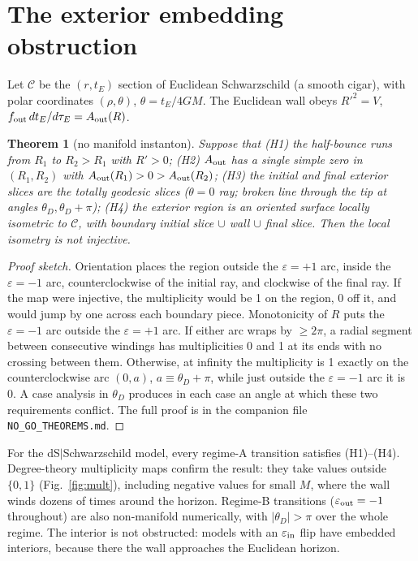\documentclass[11pt,a4paper]{article}
\newtheorem{theorem}{Theorem}
\theoremstyle{remark}\newtheorem{remark}[theorem]{Remark}
\newcommand{\ein}{\varepsilon_{\rm in}}
\newcommand{\eout}{\varepsilon_{\rm out}}
\newcommand{\fout}{f_{\rm out}}
\begin{document}
\section{The exterior embedding obstruction}\label{sec:obstruction}
Let $\mathcal C$ be the $(r,t_E)$ section of Euclidean Schwarzschild (a smooth cigar), with polar coordinates
$(\rho,\theta)$, $\theta=t_E/4GM$. The Euclidean wall obeys $R'^2=V$, $\fout\,dt_E/d\tau_E=A_{\rm out}(R)$.
\begin{theorem}[no manifold instanton]\label{thm:NG3}
Suppose that (H1) the half-bounce runs from $R_1$ to $R_2>R_1$ with $R'>0$; (H2) $A_{\rm out}$ has a single simple zero in
$(R_1,R_2)$ with $A_{\rm out}(R_1)>0>A_{\rm out}(R_2)$; (H3) the initial and final exterior slices are the totally geodesic slices
($\theta=0$ ray; broken line through the tip at angles $\theta_D,\theta_D+\pi$); (H4) the exterior region is an oriented surface
locally isometric to $\mathcal C$, with boundary initial slice $\cup$ wall $\cup$ final slice. Then the local isometry is not
injective.
\end{theorem}
\begin{proof}[Proof sketch]
Orientation places the region outside the $\varepsilon=+1$ arc, inside the $\varepsilon=-1$ arc, counterclockwise of the initial
ray, and clockwise of the final ray. If the map were injective, the multiplicity would be 1 on the region, 0 off it,
and would jump by one across each boundary piece. Monotonicity of $R$ puts the $\varepsilon=-1$ arc outside the $\varepsilon=+1$
arc. If either arc wraps by $\ge2\pi$, a radial segment between consecutive windings has multiplicities 0 and 1 at its
ends with no crossing between them. Otherwise, at infinity the multiplicity is 1 exactly on the counterclockwise arc
$(0,a)$, $a\equiv\theta_D+\pi$, while just outside the $\varepsilon=-1$ arc it is 0. A case analysis in $\theta_D$ produces in each case
an angle at which these two requirements conflict. The full proof is in the companion file \texttt{NO\_GO\_THEOREMS.md}.
\end{proof}
For the dS$|$Schwarzschild model, every regime-A transition satisfies (H1)--(H4). Degree-theory multiplicity maps confirm
the result: they take values outside $\{0,1\}$ (Fig.~\ref{fig:mult}), including negative values for small $M$, where the
wall winds dozens of times around the horizon. Regime-B transitions ($\eout=-1$ throughout) are also non-manifold
numerically, with $|\theta_D|>\pi$ over the whole regime. The interior is not obstructed: models with an $\ein$ flip have
embedded interiors, because there the wall approaches the Euclidean horizon.
\end{document}

